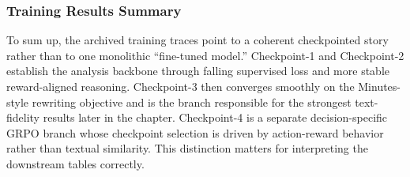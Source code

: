 





\subsubsection*{Training Results Summary}

To sum up, the archived training traces point to a coherent checkpointed story rather than to one monolithic ``fine-tuned model.'' Checkpoint-1 and Checkpoint-2 establish the analysis backbone through falling supervised loss and more stable reward-aligned reasoning. Checkpoint-3 then converges smoothly on the Minutes-style rewriting objective and is the branch responsible for the strongest text-fidelity results later in the chapter. Checkpoint-4 is a separate decision-specific GRPO branch whose checkpoint selection is driven by action-reward behavior rather than textual similarity. This distinction matters for interpreting the downstream tables correctly.








